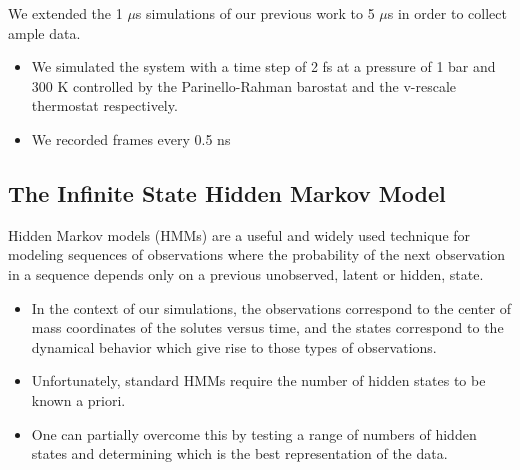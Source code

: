 \documentclass{article}
\begin{document}
  \noindent We extended the 1 $\mu$s simulations of our previous work to 5 $\mu$s in order
  to collect ample data.
  \begin{itemize}
    \item We simulated the system with a time step of 2 fs at a pressure of 1 bar
    and 300 K controlled by the Parinello-Rahman barostat and the v-rescale thermostat
    respectively.
    \item We recorded frames every 0.5 ns
  \end{itemize}

  \subsection{The Infinite State Hidden Markov Model}\label{method:iHMM}
  
  Hidden Markov models (HMMs) are a useful and widely used technique
  for modeling sequences of observations where the probability of the next observation
  in a sequence depends only on a previous unobserved, latent or hidden, state.~\cite{beal_infinite_2002}
  \begin{itemize}
    \item In the context of our simulations, the observations correspond to 
    the center of mass coordinates of the solutes versus time, and the states
    correspond to the dynamical behavior which give rise to those types
    of observations.
    \item Unfortunately, standard HMMs require the number of hidden states to be known
    a priori.
    \item One can partially overcome this by testing a range of numbers of 
    hidden states and determining which is the best representation of the
    data.
  \end{itemize}
  
\end{document}
